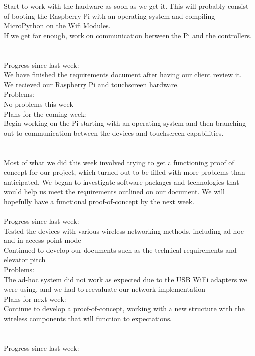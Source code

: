 \documentclass[letterpaper,10pt]{article}
\begin{document}
​Start to work with the hardware as soon as we get it. This will probably consist of ​booting the Raspberry Pi with an operating system and compiling MicroPython on the Wifi Modules. \\
If we get far enough, work on communication between the Pi and the controllers​. \\
 \\
 \\
Progress since last week: \\
​​We h​ave finished the requirements document after having our client review it. \\
We recieved our Raspberry Pi and touchscreen hardware. \\
Problems: \\
No problems this week \\
Plans for the coming week: \\
Begin working on the Pi starting with an operating system and then branching out to communication between the devices and touchscreen capabilities. \\
 \\
 \\
Most of what we did this week involved trying to get a functioning proof of concept for our project, which turned out to be filled with more problems than anticipated. We began to investigate software packages and technologies that would help us meet the requirements outlined on our document. We will hopefully have a functional proof-of-concept by the next week. \\
 \\
​Progress since last week: \\
​​Tested the devices with various wireless networking methods, including ad-hoc and in access-point mode \\
Continued to develop our documents such as the technical requirements and elevator pitch \\
Problems: \\
​The ad-hoc system did not work as expected due to the USB WiFi adapters we were using, and we had to reevaluate​ our network implementation \\
​​Plans for next week: \\
​​Continue to develop a proof-of-concept, working with a new structure with the wireless components that will function to expectations. \\
 \\
 \\
Progress since last week: \\
\end{document}
